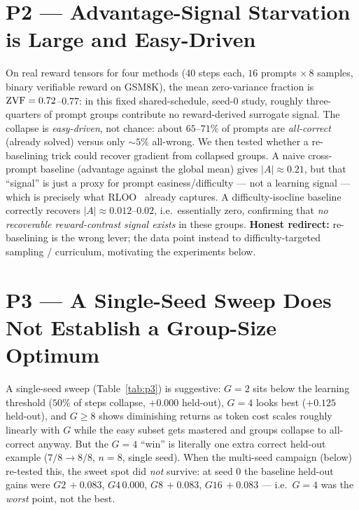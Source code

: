 \section{P2 --- Advantage-Signal Starvation is Large and Easy-Driven}
On real reward tensors for four methods (40 steps each, $16$ prompts $\times\,8$
samples, binary verifiable reward on GSM8K), the mean zero-variance fraction is
$\mathrm{ZVF} = 0.72$--$0.77$: in this fixed shared-schedule, seed-0 study, roughly
three-quarters of prompt groups contribute no reward-derived surrogate signal.
The collapse is \emph{easy-driven}, not chance: about $65$--$71\%$ of
prompts are \emph{all-correct} (already solved) versus only ${\sim}5\%$ all-wrong.
We then tested whether a re-baselining trick could recover gradient from collapsed
groups. A naive cross-prompt baseline (advantage against the global mean) gives
$|A|\approx0.21$, but that ``signal'' is just a proxy for prompt
easiness/difficulty --- not a learning signal --- which is precisely what
RLOO~\cite{ahmadian2024rloo} already captures. A difficulty-isocline baseline
correctly recovers $|A|\approx0.012$--$0.02$, i.e.\ essentially zero, confirming that
\emph{no recoverable reward-contrast signal exists} in these groups. \textbf{Honest redirect:}
re-baselining is the wrong lever; the data point instead to difficulty-targeted
sampling / curriculum, motivating the experiments below.

\section{P3 --- A Single-Seed Sweep Does Not Establish a Group-Size Optimum}
\label{sec:p3}

A single-seed sweep (Table~\ref{tab:p3}) is suggestive: $G{=}2$ sits below the
learning threshold ($50\%$ of steps collapse, $+0.000$ held-out), $G{=}4$ looks best
($+0.125$ held-out), and $G\ge8$ shows diminishing returns as token cost scales
roughly linearly with $G$ while the easy subset gets mastered and groups collapse to
all-correct anyway. But the $G{=}4$ ``win'' is literally one extra correct held-out
example ($7/8 \to 8/8$, $n=8$, single seed). When the multi-seed campaign (below)
re-tested this, the sweet spot did \emph{not} survive: at seed 0 the baseline
held-out gains were $G2\,{+}0.083$, $G4\,{0.000}$, $G8\,{+}0.083$, $G16\,{+}0.083$
--- i.e.\ $G{=}4$ was the \emph{worst} point, not the best.

